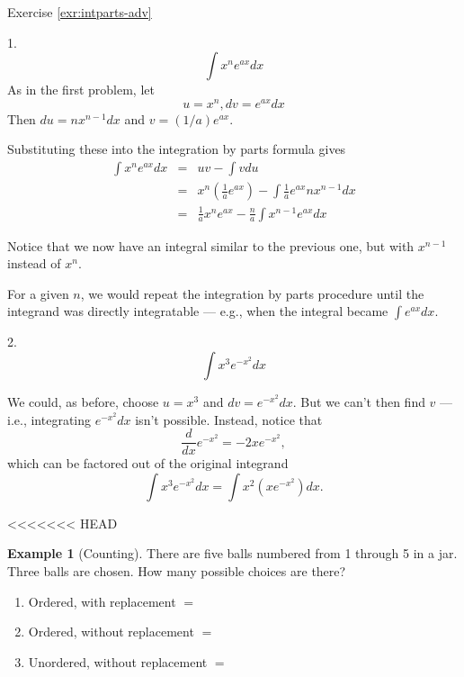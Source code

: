 \documentclass[]{book}
\theoremstyle{definition}
\theoremstyle{definition}
\newtheorem{example}{Example}[chapter]
\theoremstyle{definition}
\theoremstyle{remark}
\begin{document}
Exercise \ref{exr:intparts-adv}

1. \[\int x^n e^{ax} dx\]
{}
As in the first problem, let
\[u=x^n, dv=e^{ax}dx\]
Then \(du=n x^{n-1}dx\) and \(v=(1/a)e^{ax}\).

Substituting these into the integration by parts formula gives
\begin{eqnarray}
            \int x^n e^{ax} dx &=& u v - \int v du\nonumber\\
            &=&x^n\left( \frac{1}{a}e^{ax}\right) - \int\frac{1}{a}e^{ax} n x^{n-1} dx\nonumber\\
            &=&\frac{1}{a}x^n e^{ax} - \frac{n}{a}\int x^{n-1}e^{ax}dx\nonumber
\end{eqnarray}

Notice that we now have an integral similar to the previous one, but with \(x^{n-1}\) instead of \(x^n\).

For a given \(n\), we would repeat the integration by parts procedure until the integrand was directly integratable --- e.g., when the integral became \(\int e^{ax}dx\).

2. \[\int x^3 e^{-x^2} dx\]

{}We could, as before, choose \(u=x^3\) and \(dv=e^{-x^2}dx\). But we can't then find \(v\) --- i.e., integrating \(e^{-x^2}dx\) isn't possible. Instead, notice that \[\frac{d}{dx}e^{-x^2} = -2xe^{-x^2},\] which can be factored out of the original integrand \[\int x^3 e^{-x^2} dx = \int x^2 (xe^{-x^2})dx.\]

<<<<<<< HEAD
\begin{example}[Counting]
\protect\hypertarget{exm:counting}{}{\label{exm:counting} {} }
There are five balls numbered from 1 through 5 in a jar. Three balls are chosen. How many possible choices are there?

\begin{enumerate}
\def\labelenumi{\arabic{enumi}.}
\item
  Ordered, with replacement \(=\)
\item
  Ordered, without replacement \(=\)
\item
  Unordered, without replacement \(=\)
\end{enumerate}
\end{example}
\end{document}
